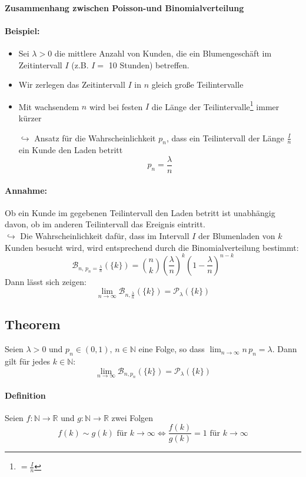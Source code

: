 \documentclass[12pt,a4paper]{article}
\begin{document}
 	\paragraph{Zusammenhang zwischen Poisson-und  Binomialverteilung}
 	\paragraph{Beispiel:}
 	\begin{itemize}
 	\item Sei $\lambda>0$ die mittlere Anzahl von Kunden, die ein Blumengeschäft im Zeitintervall $I$ (z.B. $I=$ 10 Stunden) betreffen.
 	\item Wir zerlegen das Zeitintervall $I$ in $n$ gleich große Teilintervalle
 	\item Mit wachsendem $n$ wird bei festen $I$ die Länge der Teilintervalle\footnote{$=\frac{I}{n}$} immer kürzer
 	\item[$\hookrightarrow$] Ansatz für die Wahrscheinlichkeit $p_n$, dass ein Teilintervall der Länge $\frac{I}{n}$ ein Kunde den Laden betritt
 	$$p_n=\frac{\lambda}{n}$$
 	\end{itemize}
 	
 	\paragraph{Annahme:}
 	Ob ein Kunde im gegebenen Teilintervall den Laden betritt ist unabhängig davon, ob im anderen Teilintervall das Ereignis eintritt.\\
 	$\hookrightarrow$ Die Wahrscheinlichkeit dafür, dass im Intervall $I$ der Blumenladen von $k$ Kunden besucht wird, wird entsprechend durch die Binomialverteilung bestimmt:
 	$$\mathcal{B}_{n,\, p_n=\frac{\lambda}{n}}(\{k\})=\binom{n}{k}\left(\frac{\lambda}{n}\right)^k\left(1-\frac{\lambda}{n}\right)^{n-k}$$
 	Dann lässt sich zeigen:
 	$$\lim_{n\to\infty}\mathcal{B}_{n,\frac{\lambda}{n}}(\{k\})=\mathcal{P}_{\lambda}(\{k\})$$
 	
 	\subsection{Theorem}
 	Seien $\lambda>0$ und $p_n\in(0,1),\, n\in\mathbb{N}$ eine Folge, so dass $\lim_{n\to\infty}n\, p_n=\lambda$. Dann gilt für jedes $k\in\mathbb{N}$:
 	$$\lim_{n\to\infty}\mathcal{B}_{n,p_n}(\{k\})=\mathcal{P}_{\lambda}(\{k\})$$
 	\paragraph{Definition}
 	Seien $f:\mathbb{N}\to\mathbb{R}$ und $g:\mathbb{N}\to\mathbb{R}$ zwei Folgen 
 	$$f(k)\sim g(k) \text{ für } k\to\infty \Leftrightarrow \frac{f(k)}{g(k)}=1 \text{ für } k\to\infty$$
 	
\end{document}
